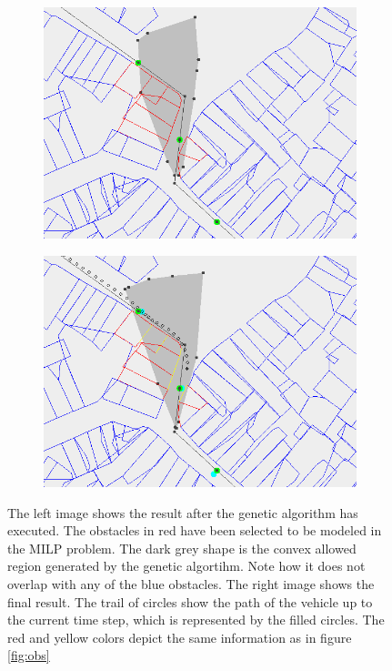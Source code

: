 \begin{figure}[!t]
    \centering
    \begin{subfigure}[t]{0.47\textwidth}
        \includegraphics[width=\textwidth]{img/pre3}
    \end{subfigure}
    \hfil
    \begin{subfigure}[t]{0.47\textwidth}
        \includegraphics[width=\textwidth]{img/pre4}
    \end{subfigure}
    \caption{The left image shows the result after the genetic algorithm has executed. The obstacles in red have been selected to be modeled in the MILP problem. The dark grey shape is the convex allowed region generated by the genetic algortihm. Note how it does not overlap with any of the blue obstacles. The right image shows the final result. The trail of circles show the path of the vehicle up to the current time step, which is represented by the filled circles. The red and yellow colors depict the same information as in figure \ref{fig:obs}}\label{fig:pre-3-4}
\end{figure}






